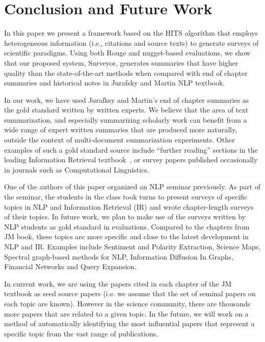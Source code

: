 \section{Conclusion and Future Work}
\label{sec:con}
In this paper we present a framework based on the HITS algorithm that employs heterogeneous information (i.e., citations and source texts) to generate surveys of scientific paradigms. Using both Rouge and nugget-based evaluations, we show that our proposed system, Surveyor, generates summaries that have higher quality than the state-of-the-art methods when compared with end of chapter summaries and historical notes in Jurafsky and Martin NLP textbook.

In our work, we have used Jurafksy and Martin's end of chapter summaries as the gold standard written by written experts. We believe that the area of text summarization, and especially summarizing scholarly work can benefit from a wide range of expert written summaries that are produced more naturally, outside the context of multi-document summarization experiments. Other examples of such a gold standard source include ``further reading'' sections in the leading Information Retrieval textbook~\cite{manning07}, or survey papers published occasionally in journals such as Computational Linguistics.

One of the authors of this paper organized an NLP seminar previously. As part of the seminar, the students in the class took turns to present surveys of specific topics in NLP and Information Retrieval (IR) and wrote chapter-length surveys of their topics. 
In future work, we plan to make use of the surveys written by NLP students as  gold standard in evaluations. Compared to the chapters from JM book, these topics are more  specific and close to the latest development in NLP and IR. Examples include  Sentiment and Polarity Extraction, Science Maps, Spectral graph-based methods for NLP,  Information Diffusion In Graphs, Financial Networks and Query Expansion. 

In current work, we are using the papers cited in each chapter of the JM textbook
as seed source papers (i.e. we assume that the set of seminal papers on each topic are known).  However in the science community, there are  thousands more papers that are related to a given topic.  In the future,  we will work on a method of automatically identifying the most influential papers that represent a specific topic from the vast range of publications.
